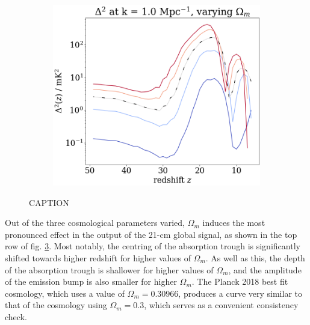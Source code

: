 \documentclass[floats,floatfix,showpacs,amssymb,prd,superscriptaddress,nofootinbib]{revtex4-2} %
\begin{document}
\begin{figure}[H]
\begin{subfigure}[b]{0.45\textwidth}
         \label{fig:power_spectrum_fixed_k_0.1_Om}
     \end{subfigure}
     \hfill
     \begin{subfigure}[b]{0.45\textwidth}
         \centering
         \includegraphics[width=\textwidth]{images/simulation_results/power_spectrum_fixed_k_1.0_Om.png}
         \label{fig:power_spectrum_fixed_k_1.0_Om}
     \end{subfigure}
        \caption{CAPTION}
        \label{fig:simulation_results_Om}
\end{figure}


Out of the three cosmological parameters varied, $\Omega_m$ induces the most pronounced effect in the output of the 21-cm global signal, as shown in the top row of fig. \ref{fig:simulation_results_Om}. Most notably, the centring of the absorption trough is significantly shifted towards higher redshift for higher values of $\Omega_m$. As well as this, the depth of the absorption trough is shallower for higher values of $\Omega_m$, and the amplitude of the emission bump is also smaller for higher $\Omega_m$. The Planck 2018 best fit cosmology, which uses a value of $\Omega_m = 0.30966$, produces a curve very similar to that of the cosmology using $\Omega_m = 0.3$, which serves as a convenient consistency check. 
\end{document}
